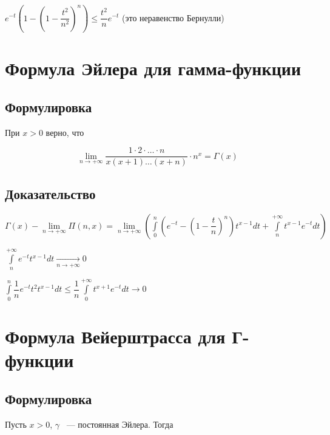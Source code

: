 \documentclass{article}
\begin{document}
                $e^{-t} \left(1 - \left(1 - \dfrac{t^2}{n^2} \right)^n \right) \leq \dfrac{t^2}{n} e^{-t}$ (это неравенство Бернулли)
                
                
    \newpage
    
    \section{Формула Эйлера для гамма-функции}
    
        \subsection{Формулировка}
        
            При $x > 0$ верно, что
            
            $$\lim\limits_{n \rightarrow +\infty} \dfrac{1 \cdot 2 \cdot \ldots \cdot n}{x(x+1)\ldots(x+n)} \cdot n^x = \Gamma(x)$$
            
        \subsection{Доказательство}
        
            $\Gamma(x) - \lim\limits_{n \rightarrow +\infty} \Pi(n, x) = \lim\limits_{n \rightarrow +\infty} \left( \int\limits^n_0 \left(e^{-t} - \left(1 - \dfrac{t}{n} \right)^n \right) t^{x - 1} dt + \int\limits^{+\infty}_n t^{x - 1} e^{-t} dt \right)$
            
            $\int\limits^{+\infty}_n e^{-t} t^{x - 1} dt \xrightarrow[n \rightarrow +\infty]{} 0$
            
            $\int\limits^n_0 \dfrac{1}{n} e^{-t} t^2 t^{x - 1} dt \leq \dfrac{1}{n} \int\limits^{+\infty}_0 t^{x + 1}e^{-t}dt \rightarrow 0$
            
    \newpage
    
    \section{Формула Вейерштрасса для Г-функции}
    
        \subsection{Формулировка}
        
            Пусть $x > 0$, $\gamma$ ~--- постоянная Эйлера. Тогда
            
\end{document}
